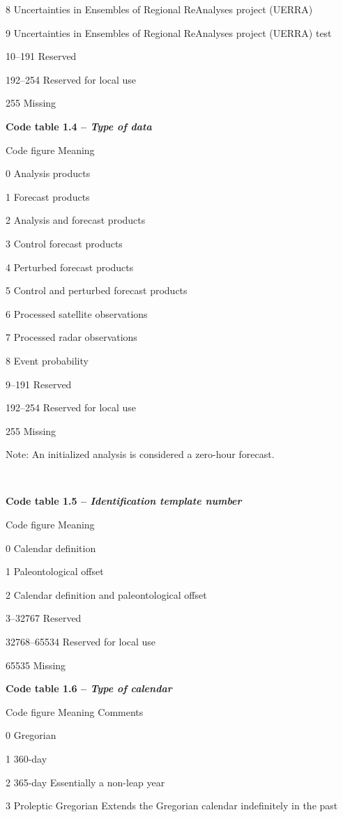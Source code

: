 8 Uncertainties in Ensembles of Regional ReAnalyses project (UERRA)

9 Uncertainties in Ensembles of Regional ReAnalyses project (UERRA) test

10--191 Reserved

192--254 Reserved for local use

255 Missing

\textbf{Code table 1.4 -- \emph{Type of data}}

Code figure Meaning

0 Analysis products

1 Forecast products

2 Analysis and forecast products

3 Control forecast products

4 Perturbed forecast products

5 Control and perturbed forecast products

6 Processed satellite observations

7 Processed radar observations

8 Event probability

9--191 Reserved

192--254 Reserved for local use

255 Missing

Note: An initialized analysis is considered a zero-hour forecast.

\textbf{\\
}

\textbf{Code table 1.5 -- \emph{Identification template number}}

Code figure Meaning

0 Calendar definition

1 Paleontological offset

2 Calendar definition and paleontological offset

3--32767 Reserved

32768--65534 Reserved for local use

65535 Missing

\textbf{Code table 1.6 -- \emph{Type of calendar}}

Code figure Meaning Comments

0 Gregorian

1 360-day

2 365-day Essentially a non-leap year

3 Proleptic Gregorian Extends the Gregorian calendar indefinitely in the past

